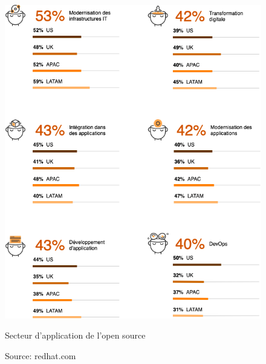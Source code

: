 \begin{appendices}
\begin{figure}[h]
	\center
	\includegraphics[scale=0.65]{./img/Use_os.png}
	\caption{Secteur d'application de l'open source}
	\caption*{\color{silver}Source: redhat.com}					
\end{figure}

\end{appendices}